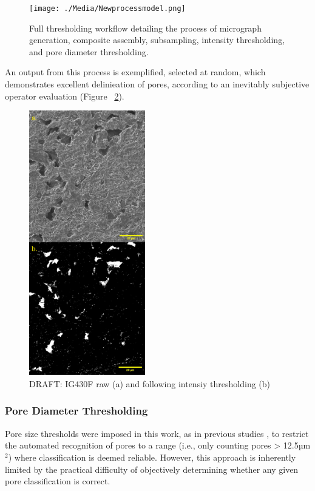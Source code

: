 \documentclass[3p,twocolumn]{elsarticle}
\begin{document}
\begin{figure}[!htbp]
    \centering
    \texttt{[image: ./Media/Newprocessmodel.png]}
    \caption{Full thresholding workflow detailing the process of micrograph generation,
     composite assembly, subsampling, intensity thresholding, and pore diameter thresholding.}
    \label{fig:Final Workflow}
\end{figure}

An output from this process is exemplified, selected at random, which demonstrates excellent delinieation 
of pores, according to an inevitably subjective operator evaluation (Figure ~\ref{fig:dualintensitythreshig430f}).

\begin{figure}[!htbp]
    \centering
    \includegraphics[width=0.45\textwidth]{./Media/intensitythresholdexampleig430fdual.png}
    \caption{DRAFT: IG430F raw (a) and following intensiy thresholding (b)}
    \label{fig:dualintensitythreshig430f}
\end{figure}

	\subsubsection{Pore Diameter Thresholding}
    
  Pore size thresholds were imposed in this work, as in previous studies
  \citep{Taylor2016, Huang2019, Kane2011a}, to restrict the automated
  recognition of pores to a range (i.e., only counting pores > 12.5µm\(^2\))
  where classification is deemed reliable. However, this approach is inherently
  limited by the practical difficulty of objectively determining whether any
  given pore classification is correct.
      
\end{document}
